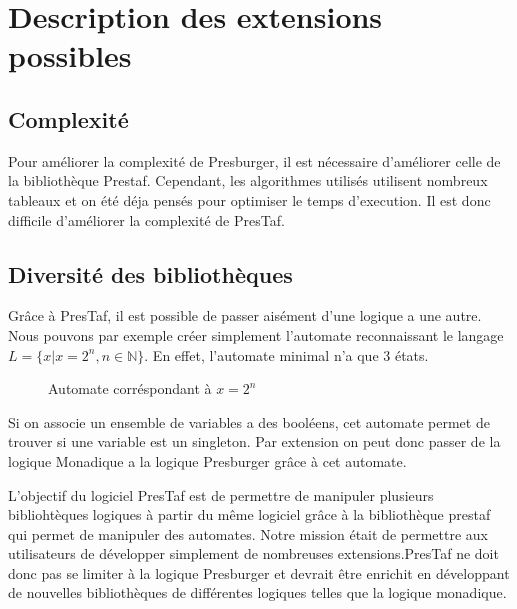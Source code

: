\section{Description des extensions possibles}

\subsection{Complexité}

Pour améliorer la complexité de Presburger, il est nécessaire d'améliorer celle de la bibliothèque Prestaf. Cependant, les algorithmes utilisés utilisent nombreux tableaux et on été déja pensés pour optimiser le temps d'execution. Il est donc difficile d'améliorer la complexité de PresTaf.

\subsection{Diversité des bibliothèques}

Grâce à PresTaf, il est possible de passer aisément d'une logique a une autre. Nous pouvons par exemple créer simplement l'automate reconnaissant le langage $L = \{x | x = 2^n, n \in \mathbb{N} \}$. En effet, l'automate minimal n'a que 3 états.

\begin{figure}[h]

\centering

\caption{Automate corréspondant à $x = 2^n$}
\end{figure}

Si on associe un ensemble de variables a des booléens, cet automate permet de trouver si une variable est un singleton. Par extension on peut donc passer de la logique Monadique a la logique Presburger grâce à cet automate.\\\par

L'objectif du logiciel PresTaf est de permettre de manipuler plusieurs bibliohtèques logiques à partir du même logiciel grâce à la bibliothèque prestaf qui permet de manipuler des automates. Notre mission était de permettre aux utilisateurs de développer simplement de nombreuses extensions.PresTaf ne doit donc pas se limiter à la logique Presburger et devrait être enrichit en développant de nouvelles bibliothèques de différentes logiques telles que la logique monadique. 
